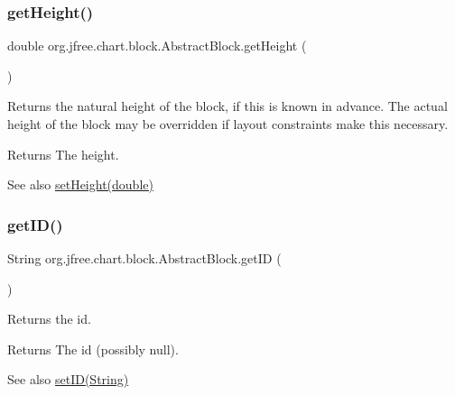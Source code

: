 \subsubsection{\texorpdfstring{get\+Height()}{getHeight()}}
{\footnotesize\ttfamily double org.\+jfree.\+chart.\+block.\+Abstract\+Block.\+get\+Height (\begin{DoxyParamCaption}{ }\end{DoxyParamCaption})}

Returns the natural height of the block, if this is known in advance. The actual height of the block may be overridden if layout constraints make this necessary.

\begin{DoxyReturn}{Returns}
The height.
\end{DoxyReturn}
\begin{DoxySeeAlso}{See also}
\mbox{\hyperlink{classorg_1_1jfree_1_1chart_1_1block_1_1_abstract_block_a093cf8477abdac969254656d9ef3d36d}{set\+Height(double)}} 
\end{DoxySeeAlso}
\mbox{\label{classorg_1_1jfree_1_1chart_1_1block_1_1_abstract_block_a81378f2ce87b2bab348e8cab684cf6d1}} 
\subsubsection{\texorpdfstring{get\+I\+D()}{getID()}}
{\footnotesize\ttfamily String org.\+jfree.\+chart.\+block.\+Abstract\+Block.\+get\+ID (\begin{DoxyParamCaption}{ }\end{DoxyParamCaption})}

Returns the id.

\begin{DoxyReturn}{Returns}
The id (possibly {\ttfamily null}).
\end{DoxyReturn}
\begin{DoxySeeAlso}{See also}
\mbox{\hyperlink{classorg_1_1jfree_1_1chart_1_1block_1_1_abstract_block_a26268ae74a9bb05e1af266f8da1e849a}{set\+I\+D(\+String)}} 
\end{DoxySeeAlso}
\mbox{\label{classorg_1_1jfree_1_1chart_1_1block_1_1_abstract_block_a31c97bb88e5c0e55a444f8b93e9c0ca8}} 

